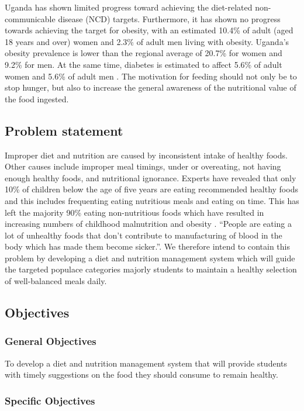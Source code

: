 \documentclass{article}
\begin{document}
Uganda has shown limited progress toward achieving the diet-related non-communicable disease (NCD) targets. Furthermore, it has shown no progress towards achieving the target for obesity, with an estimated 10.4\% of adult (aged 18 years and over) women and 2.3\% of adult men living with obesity. Uganda's obesity prevalence is lower than the regional average of 20.7\% for women and 9.2\% for men. At the same time, diabetes is estimated to affect 5.6\% of adult women and 5.6\% of adult men \cite{globalnutritionreportn.d.}. The motivation for feeding should not only be to stop hunger, but also to increase the general awareness of the nutritional value of the food ingested.

\subsection{Problem statement}
Improper diet and nutrition are caused by inconsistent intake of healthy foods. Other causes include improper meal timings, under or overeating, not having enough healthy foods, and nutritional ignorance. Experts have revealed that only 10\% of children below the age of five years are eating recommended healthy foods and this includes frequenting eating nutritious meals and eating on time. This has left the majority 90\% eating non-nutritious foods which have resulted in increasing numbers of childhood malnutrition and obesity \cite{tumwine2022only}. “People are eating a lot of unhealthy foods that don’t contribute to manufacturing of blood in the body which has made them become sicker.”\cite{tumwine2022only}. We therefore intend to contain this problem by developing a diet and nutrition management system which will guide the targeted populace categories majorly students to maintain a healthy selection of well-balanced meals daily.

\subsection{Objectives}
\subsubsection{General Objectives}

To develop a diet and nutrition management system that will provide students with timely suggestions on the food they should consume to remain healthy. 

\subsubsection{Specific Objectives}
\end{document}
